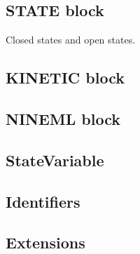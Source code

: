 \documentclass[draftspec]{ninemlspec}
\begin{document}
\subsection{STATE block}
Closed states and open states.



\subsection{KINETIC block}
%
%



\subsection{NINEML block}

\subsection{StateVariable}



\subsection{Identifiers}
\label{sec:identifier}


\subsection{Extensions}
\label{sec:extensions}
\end{document}
